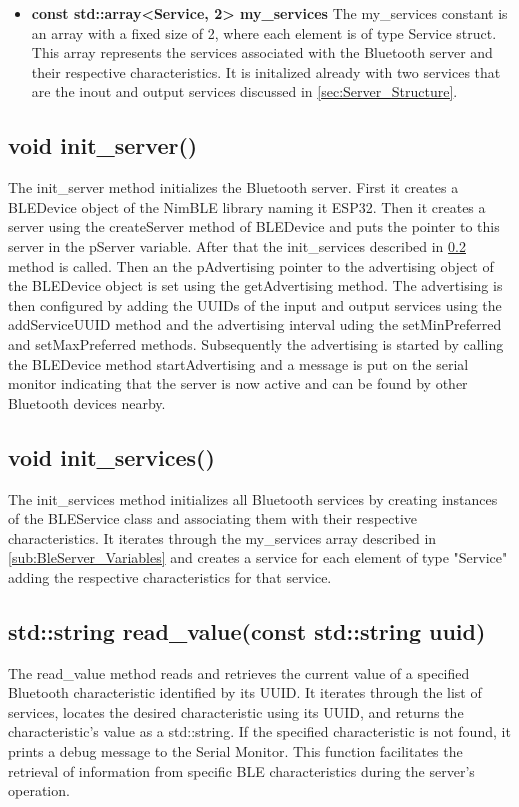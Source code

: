 \begin{itemize}
	\item \textbf{const std::array<Service, 2> my\_services}
	\newline
	The my\_services constant is an array with a fixed size of 2, where each element is of type Service struct. 
	This array represents the services associated with the Bluetooth server and their respective characteristics. 
	It is initalized already with two services that are the inout and output services discussed in \ref{sec:Server_Structure}. 
	
\end{itemize}

\subsection{void init\_server()}
\label{sub:init_server}
The init\_server method initializes the Bluetooth server. 
First it creates a BLEDevice object of the NimBLE library naming it ESP32. 
Then it creates a server using the createServer method of BLEDevice and puts the pointer to this server in the pServer variable. 
After that the init\_services described in \ref{sub:init_services} method is called. 
Then an the pAdvertising pointer to the advertising object of the BLEDevice object is set using the getAdvertising method. 
The advertising is then configured by adding the UUIDs  of the input and output services using the addServiceUUID method and the advertising interval uding the setMinPreferred and setMaxPreferred methods. 
Subsequently the advertising is started by calling the BLEDevice method startAdvertising and a message is put on the serial monitor indicating that the server is now active and can be found by other Bluetooth devices nearby. 

\subsection{void init\_services()}
\label{sub:init_services}
The init\_services method initializes all Bluetooth services by creating instances of the BLEService class and associating them with their respective characteristics. 
It iterates through the my\_services array described in \ref{sub:BleServer_Variables} and creates a service for each element of type "Service" adding the respective characteristics for that service. 

\subsection{std::string read\_value(const std::string uuid)}
\label{sub:read_value}
The read\_value method reads and retrieves the current value of a specified Bluetooth characteristic identified by its UUID. 
It iterates through the list of services, locates the desired characteristic using its UUID, and returns the characteristic's value as a std::string. 
If the specified characteristic is not found, it prints a debug message to the Serial Monitor. 
This function facilitates the retrieval of information from specific BLE characteristics during the server's operation.

